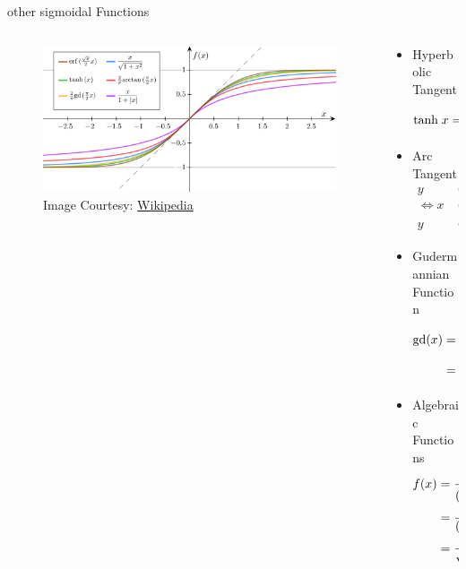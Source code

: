\documentclass[aspectratio=169,xcolor={dvipsnames,svgnames}]{beamer}
\begin{document}
\begin{frame}[label={sec:other-sigmoidal-functions}]{other sigmoidal Functions}
\begin{columns}
\begin{column}{0.65\columnwidth}
\begin{figure}[htbp]
\centering
\includegraphics[width=.9\linewidth]{org-download-images/details/2024-09-16_22-51-13_screenshot.png}
\caption{Image Courtesy: \href{https://commons.wikimedia.org/wiki/File:Gjl-t(x).svg}{Wikipedia}}
\end{figure}
\end{column}

\begin{column}{0.35\columnwidth}
\begin{itemize}[<only@+>]
\item Hyperbolic Tangent
\begin{align}
  \notag
  \mathrm{tanh}\;x
  &= \frac {e^x - e^{-x}}{e^x + e^{-x}}
\end{align}
\item Arc Tangent
\begin{align*}
  y &= \mathrm{arctan}\;x \\
  \iff x &= \tan y; \\
  y &\in \left[-\frac\pi2,\frac\pi2\right]
\end{align*}
\item Gudermannian Function
\begin{align*}
  \notag
  \mathrm{gd}(x)
  &=\int_0^x \frac{\mathrm{d}t}{\mathrm{cosh}\;t} \\
  &= 2\;\mathrm{arctan}\left(\mathrm{tanh}\left(\frac
    x2 \right) \right)
\end{align*}
\item Algebraic Functions
\begin{align}
  \notag
  f(x) &= \frac{x}{\left(1+|x|^k\right)^{1/k}} \\
  \notag
  &= \frac{x}{\left(1+|x|\right)}; \qquad k=1 \\
  \notag
  &= \frac{x}{\sqrt{1+x^2}}; \qquad k=2
\end{align}
\end{itemize}
\end{column}
\end{columns}
\end{frame}
\end{document}
